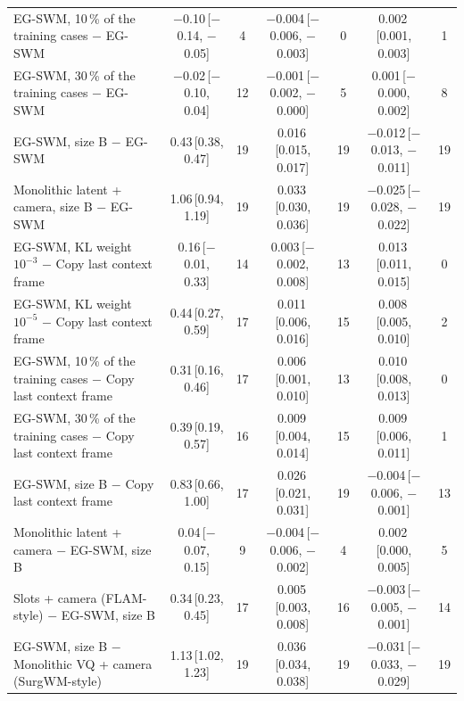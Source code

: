 \begin{tabular}{lcccccc}
EG-SWM, 10\,\% of the training cases $-$ EG-SWM & $-$0.10\,{\scriptsize[$-$0.14, $-$0.05]} & 4 & $-$0.004\,{\scriptsize[$-$0.006, $-$0.003]} & 0 & 0.002\,{\scriptsize[0.001, 0.003]} & 1 \\
EG-SWM, 30\,\% of the training cases $-$ EG-SWM & $-$0.02\,{\scriptsize[$-$0.10, 0.04]} & 12 & $-$0.001\,{\scriptsize[$-$0.002, $-$0.000]} & 5 & 0.001\,{\scriptsize[$-$0.000, 0.002]} & 8 \\
EG-SWM, size B $-$ EG-SWM & 0.43\,{\scriptsize[0.38, 0.47]} & 19 & 0.016\,{\scriptsize[0.015, 0.017]} & 19 & $-$0.012\,{\scriptsize[$-$0.013, $-$0.011]} & 19 \\
Monolithic latent + camera, size B $-$ EG-SWM & 1.06\,{\scriptsize[0.94, 1.19]} & 19 & 0.033\,{\scriptsize[0.030, 0.036]} & 19 & $-$0.025\,{\scriptsize[$-$0.028, $-$0.022]} & 19 \\
EG-SWM, KL weight $10^{-3}$ $-$ Copy last context frame & 0.16\,{\scriptsize[$-$0.01, 0.33]} & 14 & 0.003\,{\scriptsize[$-$0.002, 0.008]} & 13 & 0.013\,{\scriptsize[0.011, 0.015]} & 0 \\
EG-SWM, KL weight $10^{-5}$ $-$ Copy last context frame & 0.44\,{\scriptsize[0.27, 0.59]} & 17 & 0.011\,{\scriptsize[0.006, 0.016]} & 15 & 0.008\,{\scriptsize[0.005, 0.010]} & 2 \\
EG-SWM, 10\,\% of the training cases $-$ Copy last context frame & 0.31\,{\scriptsize[0.16, 0.46]} & 17 & 0.006\,{\scriptsize[0.001, 0.010]} & 13 & 0.010\,{\scriptsize[0.008, 0.013]} & 0 \\
EG-SWM, 30\,\% of the training cases $-$ Copy last context frame & 0.39\,{\scriptsize[0.19, 0.57]} & 16 & 0.009\,{\scriptsize[0.004, 0.014]} & 15 & 0.009\,{\scriptsize[0.006, 0.011]} & 1 \\
EG-SWM, size B $-$ Copy last context frame & 0.83\,{\scriptsize[0.66, 1.00]} & 17 & 0.026\,{\scriptsize[0.021, 0.031]} & 19 & $-$0.004\,{\scriptsize[$-$0.006, $-$0.001]} & 13 \\
Monolithic latent + camera $-$ EG-SWM, size B & 0.04\,{\scriptsize[$-$0.07, 0.15]} & 9 & $-$0.004\,{\scriptsize[$-$0.006, $-$0.002]} & 4 & 0.002\,{\scriptsize[0.000, 0.005]} & 5 \\
Slots + camera (FLAM-style) $-$ EG-SWM, size B & 0.34\,{\scriptsize[0.23, 0.45]} & 17 & 0.005\,{\scriptsize[0.003, 0.008]} & 16 & $-$0.003\,{\scriptsize[$-$0.005, $-$0.001]} & 14 \\
EG-SWM, size B $-$ Monolithic VQ + camera (SurgWM-style) & 1.13\,{\scriptsize[1.02, 1.23]} & 19 & 0.036\,{\scriptsize[0.034, 0.038]} & 19 & $-$0.031\,{\scriptsize[$-$0.033, $-$0.029]} & 19 \\

\end{tabular}
